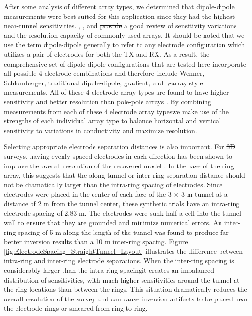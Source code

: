 \documentclass[preprint,authoryear,12pt]{elsarticle}
\providecommand{\DIFaddtex}[1]{{\protect\color{blue}\uwave{#1}}} %
\providecommand{\DIFdeltex}[1]{{\protect\color{red}\sout{#1}}}                      %
\providecommand{\DIFaddbegin}{} %
\providecommand{\DIFaddend}{} %
\providecommand{\DIFdelbegin}{} %
\providecommand{\DIFdelend}{} %
\providecommand{\DIFadd}[1]{\texorpdfstring{\DIFaddtex{#1}}{#1}} %
\providecommand{\DIFdel}[1]{\texorpdfstring{\DIFdeltex{#1}}{}} %
\begin{document}
After some analysis of different array types, we determined that dipole-dipole measurements were best suited for this application since they had the highest near-tunnel sensitivities. \citet{Spitzer1998}, \citet{Dahlin2004}, and \citet{Okpoli2013} \DIFdelbegin \DIFdel{provide }\DIFdelend \DIFaddbegin \DIFadd{provided }\DIFaddend a good review of sensitivity variations and the resolution capacity of commonly used arrays. \DIFdelbegin \DIFdel{It should be noted that }\DIFdelend \DIFaddbegin \DIFadd{Here }\DIFaddend we use the term dipole-dipole generally to refer to any electrode configuration which utilizes a pair of electrodes for both the TX and RX. As a result, the comprehensive set of dipole-dipole configurations that are tested here incorporate all possible 4 electrode combinations and therefore include Wenner, Schlumberger, traditional dipole-dipole, gradient, and $\gamma$-array style measurements. All of these 4 electrode array types are found to have higher sensitivity and better resolution than pole-pole arrays \citep{Dahlin2004, Okpoli2013}. By combining measurements from each of these 4 electrode array types\DIFaddbegin \DIFadd{, }\DIFaddend we make use of the strengths of each individual array type to balance horizontal and vertical sensitivity to variations in conductivity and maximize resolution.

Selecting appropriate electrode separation distances is also important. For \DIFdelbegin \DIFdel{3D }\DIFdelend \DIFaddbegin \DIFadd{3-D }\DIFaddend surveys, having evenly spaced electrodes in each direction has been shown to improve the overall resolution of the recovered model \citep{Okpoli2013}. In the case of the ring array, this suggests that the along-tunnel or inter-ring separation distance should not be dramatically larger than the intra-ring spacing of electrodes. Since electrodes were placed in the center of each face of the 3 $\times$ 3 m tunnel at a distance of 2 m from the tunnel center, these synthetic trials have an intra-ring electrode spacing of 2.83 m. The electrodes were sunk half a cell into the tunnel wall to ensure that they are grounded and minimize numerical errors. An inter-ring spacing of 5 m along the length of the tunnel was found to produce far better inversion results than a 10 m inter-ring spacing. Figure \ref{fig:ElectrodeSpacing_StraightTunnel_Layout} illustrates the difference between intra-ring and inter-ring electrode separations. When the inter-ring spacing is considerably larger than the intra-ring spacing\DIFaddbegin \DIFadd{, }\DIFaddend it creates an imbalanced distribution of sensitivities, with much higher sensitivities around the tunnel at the ring locations than between the rings. This situation dramatically reduces the overall resolution of the survey and can cause inversion artifacts to be placed near the electrode rings or smeared from ring to ring.
\end{document}
